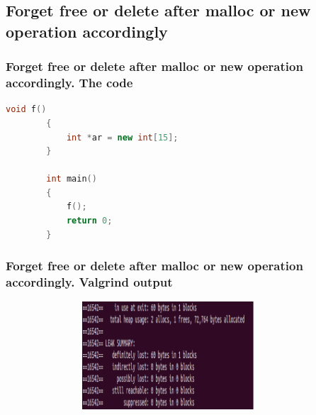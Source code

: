 \documentclass[10pt,xcolor={usenames,dvipsnames}]{beamer}
\begin{document}
\subsection{Forget free or delete after malloc or new operation accordingly}


\begin{frame}[fragile]
\frametitle{Forget free or delete after malloc or new operation accordingly. The code} 
	\begin{center}
		\begin{lstlisting}[language=C++]
		void f()
		{
			int *ar = new int[15];
		}
		
		int main()
		{
			f();
			return 0;
		}
		\end{lstlisting}
	\end{center}
\end{frame}

\begin{frame}[fragile]
	\frametitle{Forget free or delete after malloc or new operation accordingly. Valgrind output}
	\begin{center}
		\begin{figure}
			\includegraphics[height=4cm,width=10cm]{forget.png}
		\end{figure}
	\end{center}
\end{frame}
\end{document}
